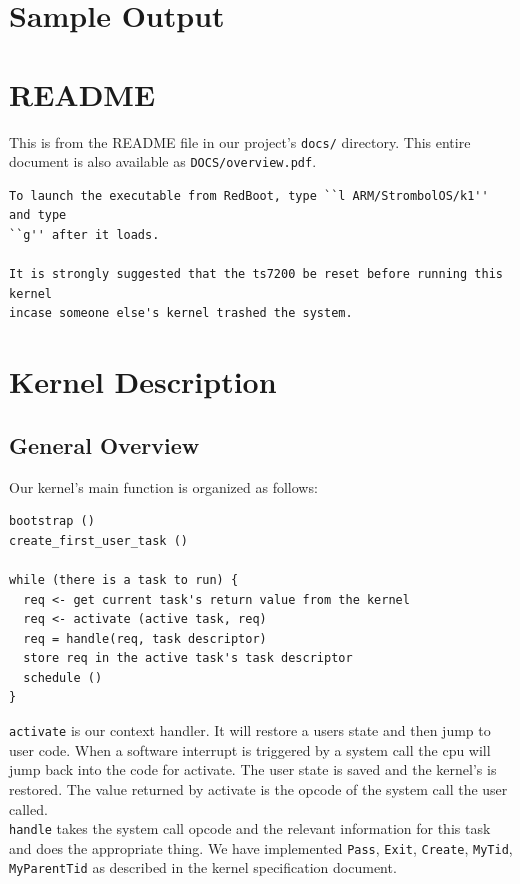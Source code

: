 \documentclass{article}
\begin{document}
\section{Sample Output}
\section{README}

This is from the README file in our project's \texttt{docs/} directory. This entire 
document is also available as \texttt{DOCS/overview.pdf}.

\begin{verbatim}
To launch the executable from RedBoot, type ``l ARM/StrombolOS/k1'' and type 
``g'' after it loads.

It is strongly suggested that the ts7200 be reset before running this kernel 
incase someone else's kernel trashed the system.
\end{verbatim}

\section{Kernel Description}
\subsection{General Overview}
Our kernel's main function is organized as follows:

\begin{verbatim}
bootstrap ()
create_first_user_task ()

while (there is a task to run) {
  req <- get current task's return value from the kernel
  req <- activate (active task, req)
  req = handle(req, task descriptor)
  store req in the active task's task descriptor
  schedule ()
}
\end{verbatim}

\texttt{activate} is our context handler. It will restore a users state and then
jump to user code. When a software interrupt is triggered by a system call the 
cpu will jump back into the code for activate. The user state is saved and the 
kernel's is restored. The value returned by activate is the opcode of the system
call the user called.\\

\texttt{handle} takes the system call opcode and the relevant information for 
this task and does the appropriate thing. We have implemented \texttt{Pass}, 
\texttt{Exit}, \texttt{Create}, \texttt{MyTid}, \texttt{MyParentTid} as 
described in the kernel specification document.\\
\end{document}
